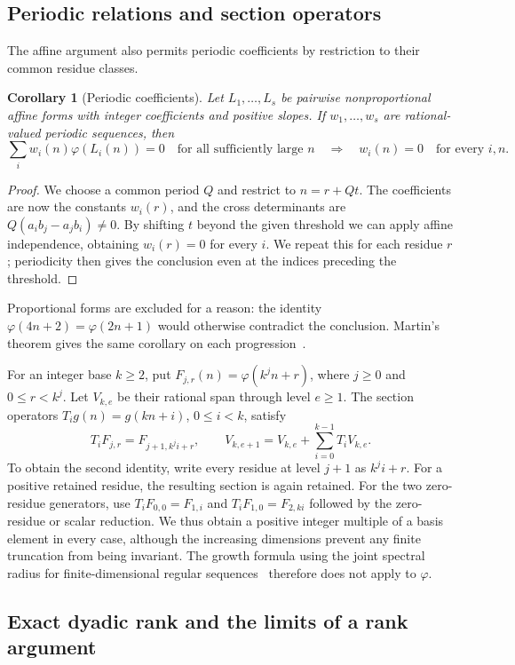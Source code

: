 \documentclass[11pt]{article}
\theoremstyle{plain}
\newtheorem{cor}[thm]{Corollary}
\theoremstyle{definition}
\theoremstyle{remark}
\newcommand{\ph}{\varphi}
\begin{document}
\subsection{Periodic relations and section operators}
The affine argument also permits periodic coefficients by restriction
to their common residue classes.
\begin{cor}[Periodic coefficients]\label{cor:periodic-freezing}
Let $L_1,\ldots,L_s$ be pairwise nonproportional affine forms with integer
coefficients and positive slopes. If $w_1,\ldots,w_s$ are rational-valued
periodic sequences, then
\[
 \sum_i w_i(n)\ph(L_i(n))=0\quad\text{for all sufficiently large }n
 \quad\Longrightarrow\quad w_i(n)=0\quad\text{for every }i,n.
\]
\end{cor}
\begin{proof}
We choose a common period $Q$ and restrict to $n=r+Qt$. The
coefficients are now the constants $w_i(r)$, and the cross
determinants are $Q(a_i b_j-a_j b_i)\ne0$. By shifting $t$ beyond
the given threshold we can apply affine independence, obtaining
$w_i(r)=0$ for every $i$. We repeat this for each residue $r$;
periodicity then gives the conclusion even at the indices preceding
the threshold.
\end{proof}
Proportional forms are excluded for a reason: the identity
$\varphi(4n+2)=\varphi(2n+1)$ would otherwise contradict the conclusion.
Martin's theorem gives the same corollary on each
progression~\cite[Thm.~1]{martin-phi-inequalities}.

For an integer base $k\ge2$, put $F_{j,r}(n)=\varphi(k^jn+r)$,
where $j\ge0$ and $0\le r<k^j$. Let $V_{k,e}$ be their rational span
through level $e\ge1$. The section operators $T_i g(n)=g(kn+i)$,
$0\le i<k$, satisfy
\[
 T_iF_{j,r}=F_{j+1,k^ji+r},\qquad
 V_{k,e+1}=V_{k,e}+\sum_{i=0}^{k-1}T_iV_{k,e}.
\]
To obtain the second identity, write every residue at level $j+1$
as $k^ji+r$. For a positive retained residue, the resulting section
is again retained. For the two zero-residue generators, use
$T_iF_{0,0}=F_{1,i}$ and $T_iF_{1,0}=F_{2,ki}$ followed by the
zero-residue or scalar reduction. We thus obtain a positive integer
multiple of a basis element in every case, although the increasing
dimensions prevent any finite truncation from being invariant.
The growth formula using the joint spectral radius for finite-dimensional regular
sequences~\cite[Thm.~1, Prop.~4, Cor.~7]{coons-jsr} therefore does not
apply to $\varphi$.


\subsection{Exact dyadic rank and the limits of a rank argument}
\label{sec:mahler-defect}
\end{document}
